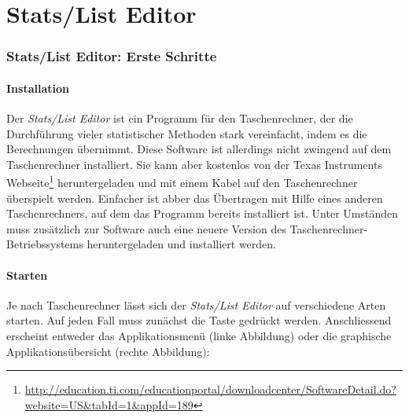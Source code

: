 \documentclass[a4paper,11pt,notitlepage,halfparskip,headsepline,normalheadings,twoside]{scrartcl}
\newlength{\tikey}
\newcommand{\keystroke}[1]{\settowidth{\tikey}{\scriptsize #1}\psframebox[framearc=0.2]{\parbox{\tikey}{\scriptsize\textsf{#1}}}}
\begin{document}
\cleardoublepage

\part{Stats/List Editor}
\section{Stats/List Editor: Erste Schritte}
\subsection{Installation}\label{installation}
Der \textit{Stats/List Editor} ist ein Programm für den Taschenrechner, der
die Durchführung vieler statistischer Methoden stark vereinfacht, indem es die
Berechnungen übernimmt. Diese Software ist allerdings nicht zwingend auf dem
Taschenrechner installiert. Sie kann aber kostenlos von der Texas Instruments
Webseite\footnote{\url{http://education.ti.com/educationportal/downloadcenter/SoftwareDetail.do?website=US&tabId=1&appId=189}}
heruntergeladen und mit einem Kabel auf den Taschenrechner überspielt
werden. Einfacher ist abber das Übertragen mit Hilfe eines anderen
Taschenrechners, auf dem das Programm bereits installiert ist. Unter Umständen
muss zusätzlich zur Software auch eine neuere Version des
Taschenrechner-Betriebssystems heruntergeladen und installiert werden.

\subsection{Starten}
Je nach Taschenrechner lässt sich der \textit{Stats/List Editor} auf
verschiedene Arten starten. Auf jeden Fall muss zunächst die Taste
\keystroke{APPS} gedrückt werden. Anschliessend erscheint entweder das
Applikationsmenü (linke Abbildung) oder die graphische Applikationsübersicht
(rechte Abbildung):
\end{document}
